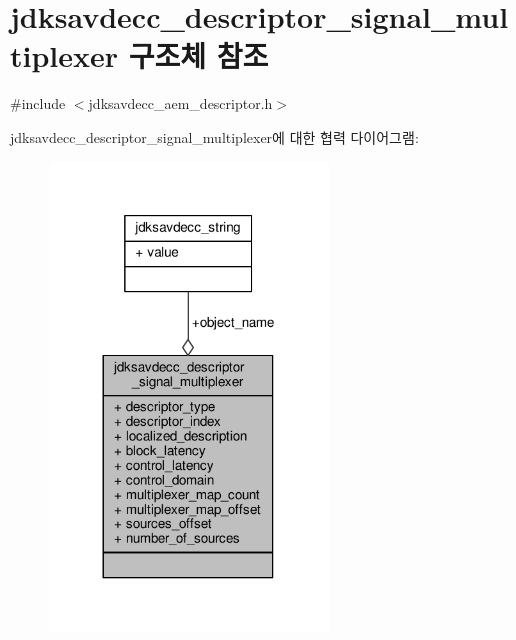 \hypertarget{structjdksavdecc__descriptor__signal__multiplexer}{}\section{jdksavdecc\+\_\+descriptor\+\_\+signal\+\_\+multiplexer 구조체 참조}
\label{structjdksavdecc__descriptor__signal__multiplexer}


{\ttfamily \#include $<$jdksavdecc\+\_\+aem\+\_\+descriptor.\+h$>$}



jdksavdecc\+\_\+descriptor\+\_\+signal\+\_\+multiplexer에 대한 협력 다이어그램\+:
\nopagebreak
\begin{figure}[H]
\begin{center}
\leavevmode
\includegraphics[width=209pt]{structjdksavdecc__descriptor__signal__multiplexer__coll__graph}
\end{center}
\end{figure}

